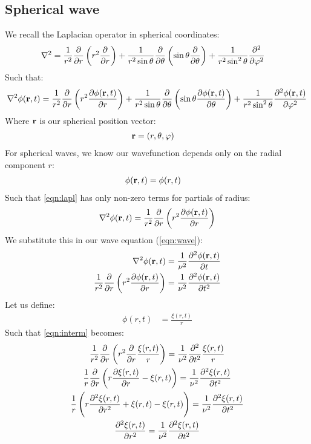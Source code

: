\subsection{Spherical wave}

We recall the Laplacian operator in spherical coordinates:
\begin{align}
    \nabla^2 &= \frac{1}{r^2}\frac{\partial }{\partial r}\left(r^2\frac{\partial }{\partial r}\right)+\frac{1}{r^2\sin\theta}\frac{\partial }{\partial \theta}\left(\sin\theta\frac{\partial }{\partial \theta}\right)+\frac{1}{r^2\sin^2\theta}\frac{\partial ^2}{\partial \varphi^2}
\end{align}
Such that:
\begin{align}
    \label{eqn:lapl}
    \nabla^2 \phi(\vb{r},t) = \frac{1}{r^2}\frac{\partial }{\partial r}\left(r^2\frac{\partial \phi(\vb{r},t)}{\partial r}\right)+\frac{1}{r^2\sin\theta}\frac{\partial }{\partial \theta}\left(\sin\theta\frac{\partial \phi(\vb{r},t)}{\partial \theta}\right)+\frac{1}{r^2\sin^2\theta}\frac{\partial ^2\phi(\vb{r},t)}{\partial \varphi^2}
\end{align}
Where $\vb{r}$ is our spherical position vector:
\begin{align*}
    \vb{r} &= (r,\theta,\varphi)
\end{align*}
For spherical waves, we know our wavefunction depends only on the radial component $r$:
\begin{align*}
    \phi(\vb{r},t) &= \phi(r,t)
\end{align*}
Such that \ref{eqn:lapl} has only non-zero terms for partials of radius:
\begin{align}
    \nabla^2 \phi(\vb{r},t) = \frac{1}{r^2}\frac{\partial }{\partial r}\left(r^2\frac{\partial \phi(\vb{r},t)}{\partial r}\right)
\end{align}
We substitute this in our wave equation (\ref{eqn:wave}):
\begin{align}
    \label{eqn:interm}
    \nabla^2 \phi(\vb{r},t) &= \frac{1}{\nu^2}\frac{\partial ^2 \phi(\vb{r},t)}{\partial t}\\
    \frac{1}{r^2}\frac{\partial }{\partial r}\left(r^2\frac{\partial \phi(\vb{r},t)}{\partial r}\right) &= \frac{1}{\nu^2}\frac{\partial ^2 \phi(\vb{r},t)}{\partial t^2}
\end{align}
Let us define:
\begin{align*}
    \phi(r,t) &= \frac{\xi(r,t)}{r}
\end{align*}
Such that \ref{eqn:interm} becomes:
\begin{gather*}
    \frac{1}{r^2}\frac{\partial }{\partial r}\left(r^2\frac{\partial }{\partial r}\frac{\xi(r,t)}{r}\right) = \frac{1}{\nu^2}\frac{\partial ^2 }{\partial t^2}\frac{\xi(r,t)}{r}\\
    \frac{1}{r}\frac{\partial }{\partial r}\left(r\frac{\partial \xi(r,t)}{\partial r}-\xi(r,t)\right) = \frac{1}{\nu^2}\frac{\partial ^2 \xi(r,t)}{\partial t^2}\\
    \frac{1}{r}\left(r\frac{\partial ^2\xi(r,t)}{\partial r^2}+\xi(r,t)-\xi(r,t)\right) = \frac{1}{\nu^2}\frac{\partial ^2 \xi(r,t)}{\partial t^2}\\
    \frac{\partial ^2\xi(r,t)}{\partial r^2}= \frac{1}{\nu^2}\frac{\partial ^2 \xi(r,t)}{\partial t^2}
\end{gather*}
